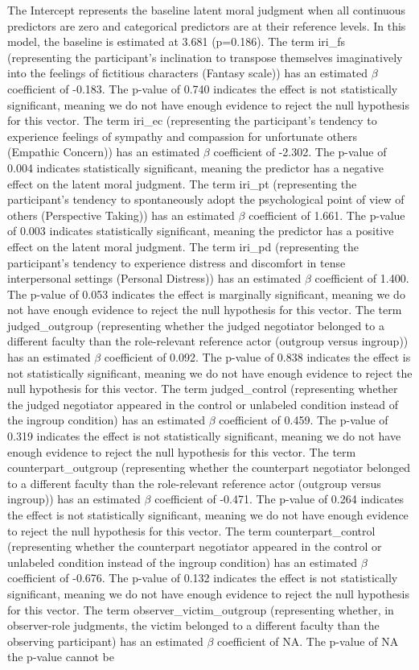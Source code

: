 \documentclass[11pt]{article}
\begin{document}
The Intercept represents the baseline latent moral judgment when all continuous predictors are zero and categorical predictors are at their reference levels. In this model, the baseline is estimated at 3.681 (p=0.186). The term iri\_fs (representing the participant's inclination to transpose themselves imaginatively into the feelings of fictitious characters (Fantasy scale)) has an estimated $\beta$ coefficient of -0.183. The p-value of 0.740 indicates the effect is not statistically significant, meaning we do not have enough evidence to reject the null hypothesis for this vector. The term iri\_ec (representing the participant's tendency to experience feelings of sympathy and compassion for unfortunate others (Empathic Concern)) has an estimated $\beta$ coefficient of -2.302. The p-value of 0.004 indicates statistically significant, meaning the predictor has a negative effect on the latent moral judgment. The term iri\_pt (representing the participant's tendency to spontaneously adopt the psychological point of view of others (Perspective Taking)) has an estimated $\beta$ coefficient of 1.661. The p-value of 0.003 indicates statistically significant, meaning the predictor has a positive effect on the latent moral judgment. The term iri\_pd (representing the participant's tendency to experience distress and discomfort in tense interpersonal settings (Personal Distress)) has an estimated $\beta$ coefficient of 1.400. The p-value of 0.053 indicates the effect is marginally significant, meaning we do not have enough evidence to reject the null hypothesis for this vector. The term judged\_outgroup (representing whether the judged negotiator belonged to a different faculty than the role-relevant reference actor (outgroup versus ingroup)) has an estimated $\beta$ coefficient of 0.092. The p-value of 0.838 indicates the effect is not statistically significant, meaning we do not have enough evidence to reject the null hypothesis for this vector. The term judged\_control (representing whether the judged negotiator appeared in the control or unlabeled condition instead of the ingroup condition) has an estimated $\beta$ coefficient of 0.459. The p-value of 0.319 indicates the effect is not statistically significant, meaning we do not have enough evidence to reject the null hypothesis for this vector. The term counterpart\_outgroup (representing whether the counterpart negotiator belonged to a different faculty than the role-relevant reference actor (outgroup versus ingroup)) has an estimated $\beta$ coefficient of -0.471. The p-value of 0.264 indicates the effect is not statistically significant, meaning we do not have enough evidence to reject the null hypothesis for this vector. The term counterpart\_control (representing whether the counterpart negotiator appeared in the control or unlabeled condition instead of the ingroup condition) has an estimated $\beta$ coefficient of -0.676. The p-value of 0.132 indicates the effect is not statistically significant, meaning we do not have enough evidence to reject the null hypothesis for this vector. The term observer\_victim\_outgroup (representing whether, in observer-role judgments, the victim belonged to a different faculty than the observing participant) has an estimated $\beta$ coefficient of NA. The p-value of NA the p-value cannot be 
\end{document}
